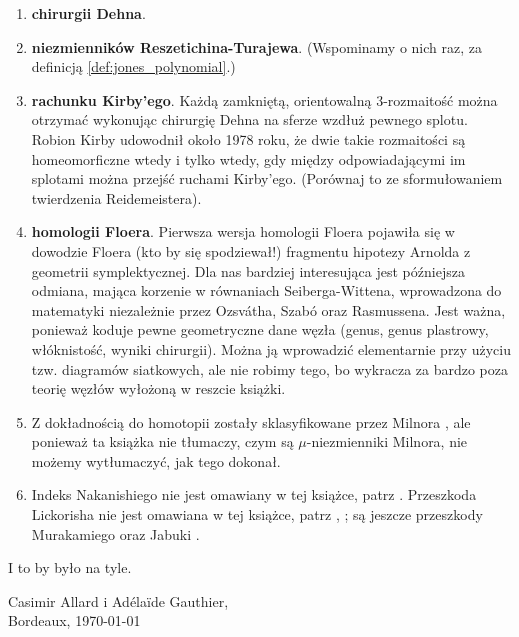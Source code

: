 \begin{enumerate}
    \item \textbf{chirurgii Dehna}.
    \item \textbf{niezmienników Reszetichina-Turajewa}.
    (Wspominamy o nich raz, za definicją \ref{def:jones_polynomial}.)
    \item \textbf{rachunku Kirby'ego}.
    Każdą zamkniętą, orientowalną 3-rozmaitość można otrzymać wykonując chirurgię Dehna na sferze wzdłuż pewnego splotu. Robion Kirby udowodnił około 1978 roku, że dwie takie rozmaitości są homeomorficzne wtedy i tylko wtedy, gdy między odpowiadającymi im splotami można przejść ruchami Kirby'ego.
    (Porównaj to ze sformułowaniem twierdzenia Reidemeistera).
    \item \textbf{homologii Floera}.
    Pierwsza wersja homologii Floera pojawiła się w dowodzie Floera (kto by się spodziewał!) fragmentu hipotezy Arnolda z geometrii symplektycznej.
    Dla nas bardziej interesująca jest późniejsza odmiana, mająca korzenie w równaniach Seiberga-Wittena, wprowadzona do matematyki niezależnie przez Ozsvátha, Szabó oraz Rasmussena.
    Jest ważna, ponieważ koduje pewne geometryczne dane węzła (genus, genus plastrowy, włóknistość, wyniki chirurgii).
    Można ją wprowadzić elementarnie przy użyciu tzw. diagramów siatkowych, ale nie robimy tego, bo wykracza za bardzo poza teorię węzłów wyłożoną w reszcie książki.
    \item Z dokładnością do homotopii zostały sklasyfikowane przez Milnora \cite{milnor1954}, ale ponieważ ta książka nie tłumaczy, czym są $\mu$-niezmienniki Milnora, nie możemy wytłumaczyć, jak tego dokonał.
    \item Indeks Nakanishiego nie jest omawiany w tej książce, patrz \cite{nakanishi1981}.
    Przeszkoda Lickorisha nie jest omawiana w tej książce, patrz \cite{cochran1986}, \cite{lickorish1985}; są jeszcze przeszkody Murakamiego \cite{murakami1990} oraz Jabuki \cite{jabuka2010}.
\end{enumerate}
I to by było na tyle.
\begin{flushright}
    Casimir Allard i Adélaïde Gauthier,\\Bordeaux, \today
\end{flushright}

